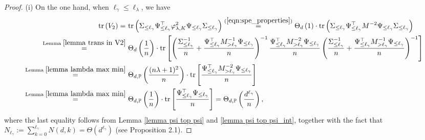 \documentclass{article}
\theoremstyle{plain}
\theoremstyle{definition}
\theoremstyle{remark}
\newcommand{\green}{\color{green}}
\newcommand{\dhnote}[1]{{\color{red}[#1]} } %
\begin{document}
\begin{appendix}
\begin{proof}
\noindent (i) On the one hand, when $\ell_{\gamma} \leq \ell_{\lambda}$, we have
\begin{equation}\label{eqn_v_2_large_regular_para}
    \begin{aligned}
        \mathrm{tr} \left( V_{2} \right)
        =&~
        \mathrm{tr} \left( \Sigma_{\leq \ell_{\gamma}} \Psi_{\leq \ell_{\gamma}}^{\top}  \varphi_{\lambda, K}^2 \Psi_{\leq \ell_{\gamma}} \Sigma_{\leq \ell_{\gamma}} \right)
        \overset{(\ref{eqn:spe_properties})}{=} \Theta_d\left(1\right) \cdot
        \mathrm{tr} \left( \Sigma_{\leq \ell_{\gamma}} \Psi_{\leq \ell_{\gamma}}^{\top}  M^{-2} \Psi_{\leq \ell_{\gamma}} \Sigma_{\leq \ell_{\gamma}} \right)\\
        \overset{\text{Lemma } \ref{lemma trans in V2}}{=}&~
        \Theta_d\left(\frac{1}{n}\right) \cdot \mathrm{tr} \left[ \left( \frac{\Sigma_{\leq \ell_{\gamma}}^{-1}}{n} + \frac{\Psi_{\leq \ell_{\gamma}}^{\top} M_{>\ell_{\gamma}}^{-1} \Psi_{\leq \ell_{\gamma}}}{n}   \right)^{-1} \frac{\Psi_{\leq \ell_{\gamma}}^{\top} M_{>\ell_{\gamma}}^{-2} \Psi_{\leq \ell_{\gamma}}}{n} \left( \frac{\Sigma_{\leq \ell_{\gamma}}^{-1}}{n} + \frac{\Psi_{\leq \ell_{\gamma}}^{\top} M_{>\ell_{\gamma}}^{-1} \Psi_{\leq \ell_{\gamma}}}{n}   \right)^{-1}  \right]\\
        \overset{\text{Lemma } \ref{lemma lambda max min}}{=}&~
        \Theta_{d, \mathbb{P}}\left(\frac{(n\lambda+1)^2}{n}\right) \cdot \mathrm{tr} \left[  \frac{\Psi_{\leq \ell_{\gamma}}^{\top} M_{>\ell_{\gamma}}^{-2} \Psi_{\leq \ell_{\gamma}}}{n}   \right]\\
        \overset{\text{Lemma } \ref{lemma lambda max min}}{=}&~
        \Theta_{d, \mathbb{P}}\left(\frac{1}{n}\right) \cdot \mathrm{tr} \left[  \frac{\Psi_{\leq \ell_{\gamma}}^{\top} \Psi_{\leq \ell_{\gamma}}}{n}   \right]
        =
        \Theta_{d, \mathbb{P}}\left(\frac{d^{\ell_{\gamma}}}{n}\right),
    \end{aligned}
\end{equation}
where the last equality follows from Lemma \ref{lemma psi top psi} and \ref{lemma psi top psi_int}, together with the fact that $N_{\ell_{\gamma}}:= \sum_{k=0}^{\ell_{\gamma}} N(d, k) = \Theta(d^{\ell_{\gamma}})$ (see Proposition 2.1).





\end{proof}
\end{appendix}
\end{document}
